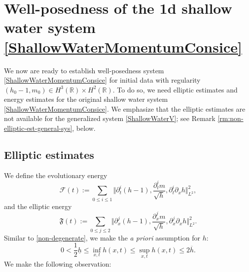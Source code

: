 \documentclass[reqno,11pt]{amsart}
\newcommand{\norm}[2]{\Vert #1 \Vert_{#2}}
\theoremstyle{plain}
\theoremstyle{definition}
\numberwithin{equation}{section}
\begin{document}
\section{Well-posedness of the 1d shallow water system \eqref{ShallowWaterMomentumConsice}}
\label{Sect:WP}


We now are ready to establish well-posedness system \eqref{ShallowWaterMomentumConsice} for initial data with regularity $(h_0-1,m_0)\in H^3(\mathbb R)\times H^2 (\mathbb R)$. To do so, we need elliptic estimates and energy estimates for the original shallow water system \eqref{ShallowWaterMomentumConsice}. We emphasize that the elliptic estimates are not available for the generalized system \eqref{ShallowWaterV}; see Remark \ref{rm:non-elliptic-est-general-sys}, below. 
\subsection{Elliptic estimates} We define the evolutionary energy 
\begin{equation}
    \label{EnergyEvolution}
    \mathcal F(t) := \sum_{0\leq i\leq 1} \norm{\partial_t^i (h-1),\frac{\partial_t^i m}{\sqrt h}, \partial_t^i \partial_x h}{L^2}^2,
\end{equation}
and the elliptic energy 
\begin{equation}
\label{EnergyElliptic}
    \mathfrak F(t):=\sum_{0\leq j\leq 2} \Vert \partial_x ^j (h-1),\frac{\partial_x^j m}{\sqrt{h}},\partial_x^{j}\partial_x h\Vert_{L^2}^2.
\end{equation}
Similar to \eqref{non-degenerate}, we make the {\it a priori} assumption for $ h $:
\begin{equation}
    \label{non-degenerate-h}
  0<\frac{1}{2}\underline h \leq \inf_{x,t} h(x,t) \leq \sup_{x,t} h(x,t) \leq 2 \overline h.
\end{equation}
We make the following observation:
\end{document}
